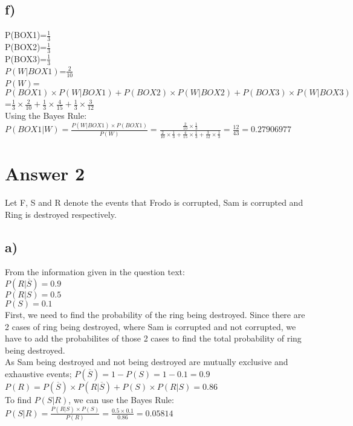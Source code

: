 \documentclass[12pt]{article}
\begin{document}
\subsection*{f)}
P(BOX1)=$\frac{1}{3}$\\
P(BOX2)=$\frac{1}{3}$\\
P(BOX3)=$\frac{1}{3}$\\
$P(W|BOX1)$=$\frac{2}{10}$\\
$P(W)$=$P(BOX1) \times P(W|BOX1) + P(BOX2) \times P(W|BOX2) + P(BOX3) \times P(W|BOX3)$=$\frac{1}{3} \times \frac{2}{10}+\frac{1}{3} \times \frac{4}{15} + \frac{1}{3} \times \frac{3}{12}$\\
Using the Bayes Rule:\\
$P(BOX1|W)=\frac{P(W|BOX1) \times P(BOX1)}{P(W)}=\frac{\frac{2}{10} \times \frac{1}{3}}{\frac{2}{10} \times \frac{1}{3}+\frac{4}{15} \times \frac{1}{3}+\frac{3}{12} \times \frac{1}{3}}=\frac{12}{43}=0.27906977$\\
\section*{Answer 2}
Let F, S and R denote the events that Frodo is corrupted, Sam is corrupted and Ring is destroyed respectively.
\subsection*{a)}
From the information given in the question text:\\
$P(R|\overline{S})=0.9$\\
$P(R|S)=0.5$\\
$P(S)=0.1$\\
First, we need to find the probability of the ring being destroyed. Since there are 2 cases of ring being destroyed, where Sam is corrupted and not corrupted, we have to add the probabilites of those 2 cases to find the total probability of ring being destroyed.\\
As Sam being destroyed and not being destroyed are mutually exclusive and exhaustive events;
$P(\overline{S})=1-P(S)=1-0.1=0.9$\\
$P(R)=P(\overline{S}) \times P(R|\overline{S}) + P(S) \times P(R|S)=0.86 $\\
To find $P(S|R)$, we can use the Bayes Rule:\\
$P(S|R)=\frac{P(R|S) \times P(S)}{P(R)}=\frac{0.5 \times 0.1}{0.86}=0.05814$
\end{document}
